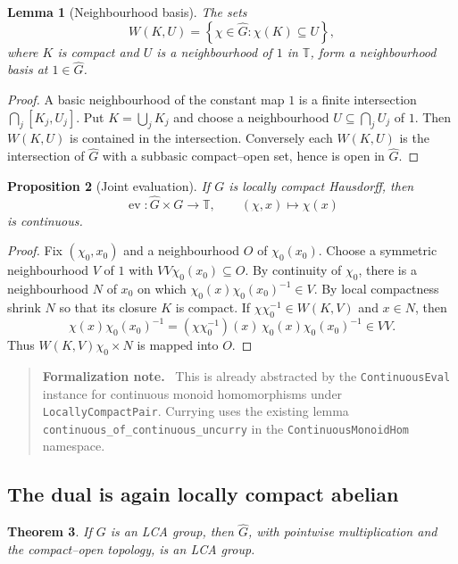 \documentclass[11pt]{article}
\newtheorem{theorem}{Theorem}[section]
\newtheorem{proposition}[theorem]{Proposition}
\newtheorem{lemma}[theorem]{Lemma}
\theoremstyle{definition}
\theoremstyle{remark}
\newcommand{\T}{\mathbb T}
\newcommand{\ev}{\operatorname{ev}}
\newcommand{\dual}[1]{\widehat{#1}}
\newcommand{\set}[1]{\left\{#1\right\}}
\newenvironment{formalization}
  {\begin{quote}\small\noindent\textbf{Formalization note.}\ }
  {\end{quote}}
\begin{document}
\begin{lemma}[Neighbourhood basis]
\label{lem:dual-neighbourhood-basis}
The sets
\[
  W(K,U)=\set{\chi\in\dual G:\chi(K)\subseteq U},
\]
where $K$ is compact and $U$ is a neighbourhood of $1$ in $\T$, form a neighbourhood
basis at $1\in\dual G$.
\end{lemma}

\begin{proof}
A basic neighbourhood of the constant map $1$ is a finite intersection
$\bigcap_j[K_j,U_j]$.  Put $K=\bigcup_jK_j$ and choose a neighbourhood
$U\subseteq\bigcap_jU_j$ of $1$.  Then $W(K,U)$ is contained in the intersection.
Conversely each $W(K,U)$ is the intersection of $\dual G$ with a subbasic compact--open
set, hence is open in $\dual G$.
\end{proof}

\begin{proposition}[Joint evaluation]
\label{prop:joint-evaluation}
If $G$ is locally compact Hausdorff, then
\[
  \ev:\dual G\times G\longrightarrow\T,\qquad(\chi,x)\longmapsto\chi(x)
\]
is continuous.
\end{proposition}

\begin{proof}
Fix $(\chi_0,x_0)$ and a neighbourhood $O$ of $\chi_0(x_0)$.  Choose a symmetric
neighbourhood $V$ of $1$ with $VV\chi_0(x_0)\subseteq O$.  By continuity of $\chi_0$,
there is a neighbourhood $N$ of $x_0$ on which
$\chi_0(x)\chi_0(x_0)^{-1}\in V$.  By local compactness shrink $N$ so that its closure
$K$ is compact.  If $\chi\chi_0^{-1}\in W(K,V)$ and $x\in N$, then
\[
  \chi(x)\chi_0(x_0)^{-1}
  =(\chi\chi_0^{-1})(x)\,
    \chi_0(x)\chi_0(x_0)^{-1}\in VV.
\]
Thus $W(K,V)\chi_0\times N$ is mapped into $O$.
\end{proof}

\begin{formalization}
This is already abstracted by the \texttt{ContinuousEval} instance for continuous
monoid homomorphisms under \texttt{LocallyCompactPair}.  Currying uses the existing
lemma \texttt{continuous\_of\_continuous\_uncurry} in the
\texttt{ContinuousMonoidHom} namespace.
\end{formalization}

\subsection{The dual is again locally compact abelian}

\begin{theorem}
\label{thm:dual-lca}
If $G$ is an LCA group, then $\dual G$, with pointwise multiplication and the
compact--open topology, is an LCA group.
\end{theorem}
\end{document}
